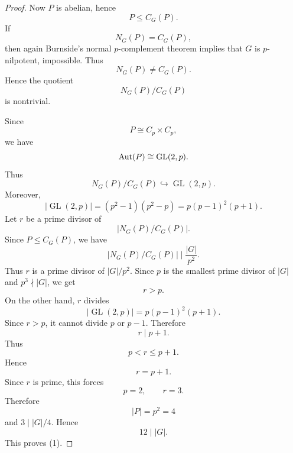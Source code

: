 \begin{proof}
Now $P$ is abelian, hence
\[
    P\leq C_G(P).
\]
If
\[
    N_G(P)=C_G(P),
\]
then again Burnside's normal $p$-complement theorem implies that $G$ is $p$-nilpotent, impossible. Thus
\[
    N_G(P)\neq C_G(P).
\]
Hence the quotient
\[
    N_G(P)/C_G(P)
\]
is nontrivial.

Since
\[
    P\cong C_p\times C_p,
\]
we have
\[
    \operatorname{Aut}(P)\cong \operatorname{GL}(2,p).
\]
Thus
\[
    N_G(P)/C_G(P)\hookrightarrow \operatorname{GL}(2,p).
\]
Moreover,
\[
    |\operatorname{GL}(2,p)|
    =
    (p^2-1)(p^2-p)
    =
    p(p-1)^2(p+1).
\]
Let $r$ be a prime divisor of
\[
    \left|N_G(P)/C_G(P)\right|.
\]
Since $P\leq C_G(P)$, we have
\[
    \left|N_G(P)/C_G(P)\right|
    \mid
    \frac{|G|}{p^2}.
\]
Thus $r$ is a prime divisor of $|G|/p^2$. Since $p$ is the smallest prime divisor of $|G|$ and $p^3\nmid |G|$, we get
\[
    r>p.
\]
On the other hand, $r$ divides
\[
    |\operatorname{GL}(2,p)|=p(p-1)^2(p+1).
\]
Since $r>p$, it cannot divide $p$ or $p-1$. Therefore
\[
    r\mid p+1.
\]
Thus
\[
    p<r\leq p+1.
\]
Hence
\[
    r=p+1.
\]
Since $r$ is prime, this forces
\[
    p=2,
    \qquad
    r=3.
\]
Therefore
\[
    |P|=p^2=4
\]
and $3\mid |G|/4$. Hence
\[
    12\mid |G|.
\]
This proves (1).
\end{proof}

